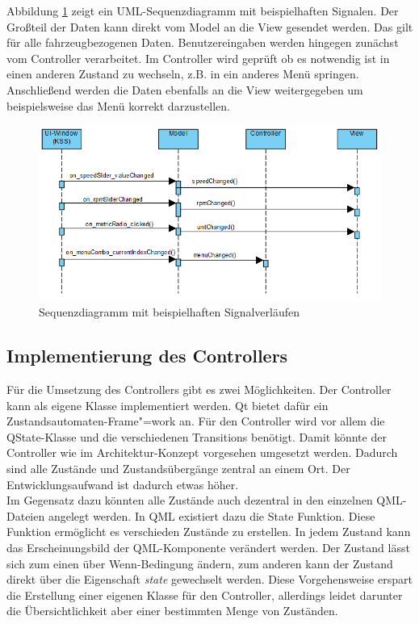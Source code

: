 Abbildung \ref{fig:uml_sequenz} zeigt ein UML-Sequenzdiagramm mit beispielhaften Signalen. Der Großteil der Daten kann direkt vom Model an die View gesendet werden. Das gilt für alle fahrzeugbezogenen Daten. Benutzereingaben werden hingegen zunächst vom Controller verarbeitet. Im Controller wird geprüft ob es notwendig ist in einen anderen Zustand zu wechseln, z.B. in ein anderes Menü springen. Anschließend werden die Daten ebenfalls an die View weitergegeben um beispielsweise das Menü korrekt darzustellen.\\

\begin{figure}[htb]
	\centering
	\includegraphics[width=\textwidth]{img/5_implementierung/uml_sequenz}
	\caption{Sequenzdiagramm mit beispielhaften Signalverläufen}
	\label{fig:uml_sequenz}
\end{figure}

\subsection{Implementierung des Controllers}
Für die Umsetzung des Controllers gibt es zwei Möglichkeiten. Der Controller kann als eigene Klasse implementiert werden. Qt bietet dafür ein Zustandsautomaten-Frame"=work an. Für den Controller wird vor allem die QState-Klasse und die verschiedenen Transitions benötigt. Damit könnte der Controller wie im Architektur-Konzept vorgesehen umgesetzt werden. Dadurch sind alle Zustände und Zustandsübergänge zentral an einem Ort. Der Entwicklungsaufwand ist dadurch etwas höher.\\

Im Gegensatz dazu könnten alle Zustände auch dezentral in den einzelnen QML-Dateien angelegt werden. In QML existiert dazu die State Funktion. Diese Funktion ermöglicht es verschieden Zustände zu erstellen. In jedem Zustand kann das Erscheinungsbild der QML-Komponente verändert werden. Der Zustand lässt sich zum einen über Wenn-Bedingung ändern, zum anderen kann der Zustand direkt über die Eigenschaft \textit{state} gewechselt werden. Diese Vorgehensweise erspart die Erstellung einer eigenen Klasse für den Controller, allerdings leidet darunter die Übersichtlichkeit aber einer bestimmten Menge von Zuständen.\\

